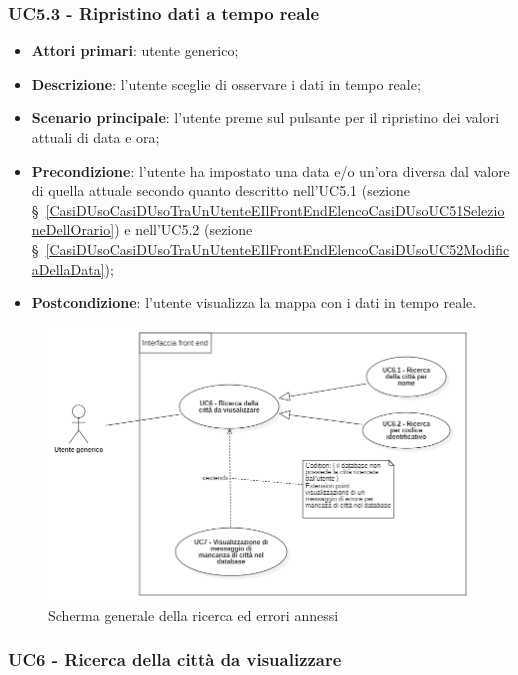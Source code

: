 \subsubsection{UC5.3 - Ripristino dati a tempo reale}\label{CasiDUsoCasiDUsoTraUnUtenteEIlFrontEndElencoCasiDUsoUC53RipristinoDatiATempoReale}
\begin{itemize}
	\item \textbf{Attori primari}: utente generico;
	\item \textbf{Descrizione}:  l’utente sceglie di osservare i dati in tempo reale;
	\item \textbf{Scenario principale}: l’utente preme sul pulsante per il ripristino dei valori attuali di data e ora;
	\item \textbf{Precondizione}: l’utente ha impostato una data e/o un’ora diversa dal valore di quella attuale secondo quanto descritto nell'UC5.1 (sezione \S~\ref{CasiDUsoCasiDUsoTraUnUtenteEIlFrontEndElencoCasiDUsoUC51SelezioneDellOrario}) e nell'UC5.2 (sezione \S~\ref{CasiDUsoCasiDUsoTraUnUtenteEIlFrontEndElencoCasiDUsoUC52ModificaDellaData});
	\item \textbf{Postcondizione}: l’utente visualizza la mappa con i dati in tempo reale.
\end{itemize}


\begin{center}
	\begin{figure}[H]
		\centering\includegraphics[scale=0.8]{../immagini/attori_casi/uc6.png}
		\caption{Scherma generale della ricerca ed errori annessi}
	\end{figure}
\end{center}


\subsubsection{UC6 - Ricerca della città da visualizzare}\label{CasiDUsoCasiDUsoTraUnUtenteEIlFrontEndElencoCasiDUsoUC6RicercaDellaCittàDaVisualizzare}

